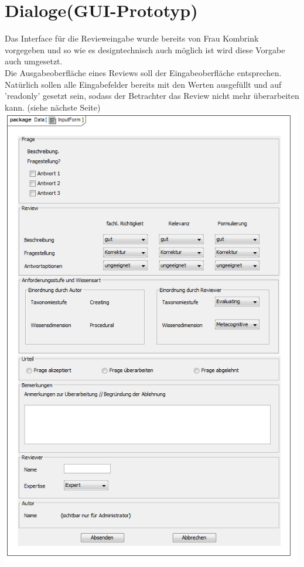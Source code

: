 \documentclass[a4paper]{scrreprt}
\begin{document}
\chapter{Dialoge(GUI-Prototyp)}
Das Interface für die Revieweingabe wurde bereits von Frau Kombrink vorgegeben und so wie es designtechnisch auch möglich ist wird diese Vorgabe auch umgesetzt.\\
Die Ausgabeoberfläche eines Reviews soll der Eingabeoberfläche entsprechen. Natürlich sollen alle Eingabefelder bereits mit den Werten ausgefüllt und auf 'readonly' gesetzt sein, sodass der Betrachter das Review nicht mehr überarbeiten kann.
(siehe nächste Seite)
\includegraphics[width=0.99\textwidth]{User_Interface_Modeling_Diagram__InputForm.png}
\label{Grafische Benutzeroberfläche}\\
\end{document}

